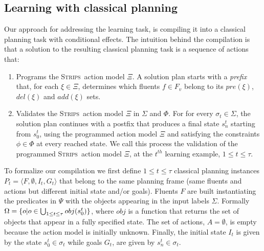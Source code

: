 \documentclass{article}
\newcommand{\tup}[1]{{\langle #1 \rangle}}
\newcommand{\strips}{\textsc{Strips}}     %
\begin{document}
\subsection{Learning with classical planning}

Our approach for addressing the learning task, is compiling it into a classical planning task with conditional effects. The intuition behind the compilation is that a solution to the resulting classical planning task is a sequence of actions that:
\begin{enumerate}
\item Programs the \strips\ action model $\Xi$. A solution plan starts with a {\em prefix} that, for each $\xi\in\Xi$, determines which fluents $f\in F_v$ belong to its $pre(\xi)$, $del(\xi)$ and $add(\xi)$ sets.
\item Validates the \strips\ action model $\Xi$ in $\Sigma$ and $\Phi$. For for every $\sigma_t\in \Sigma$, the solution plan continues with a postfix that produces a final state $s_{n}^t$ starting from $s_0^t$, using the programmed action model $\Xi$ and satisfying the constraints $\phi\in\Phi$ at every reached state. We call this process the validation of the programmed \strips\ action model $\Xi$, at the $t^{th}$ learning example, {\small $1\leq t\leq \tau$}. %
\end{enumerate}

To formalize our compilation we first define {\small $1\leq t\leq \tau$} classical planning instances $P_t=\tup{F,\emptyset,I_t,G_t}$ that belong to the same planning frame (same fluents and actions but different initial state and/or goals). Fluents $F$ are built instantiating the predicates in $\Psi$ with the objects appearing in the input labels $\Sigma$. Formally $\Omega=\{o|o\in \bigcup_{\small 1\leq t\leq \tau} obj(s_0^t)\}$, where $obj$ is a function that returns the set of objects that appear in a fully specified state. The set of actions, $A=\emptyset$, is empty because the action model is initially unknown. Finally, the initial state $I_t$ is given by the state $s_0^t\in \sigma_t$ while goals $G_t$, are given by $s_n^t\in \sigma_t$.
\end{document}
